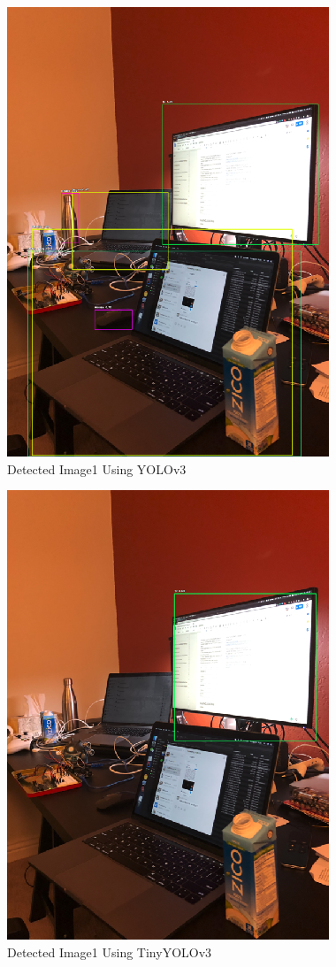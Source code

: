 \begin{figure}
  \includegraphics{figure4}
  \caption{Detected Image1 Using YOLOv3}
\end{figure}

\begin{figure}
  \includegraphics{figure5}
  \caption{Detected Image1 Using TinyYOLOv3}
\end{figure}

